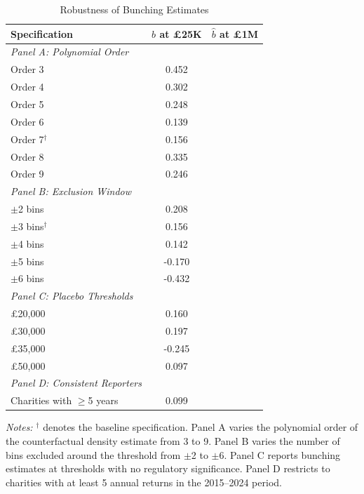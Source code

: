 \begin{table}[htbp]
\centering
\caption{Robustness of Bunching Estimates}
\label{tab:robustness}
\begin{tabular}{lcc}
\hline\hline
Specification & $\hat{b}$ at \pounds25K & $\hat{b}$ at \pounds1M \\
\hline
\addlinespace
\emph{Panel A: Polynomial Order} & & \\
\quad Order 3 & 0.452 & \\
\quad Order 4 & 0.302 & \\
\quad Order 5 & 0.248 & \\
\quad Order 6 & 0.139 & \\
\quad Order 7$^{\dagger}$ & 0.156 & \\
\quad Order 8 & 0.335 & \\
\quad Order 9 & 0.246 & \\
\addlinespace
\emph{Panel B: Exclusion Window} & & \\
\quad $\pm$2 bins & 0.208 & \\
\quad $\pm$3 bins$^{\dagger}$ & 0.156 & \\
\quad $\pm$4 bins & 0.142 & \\
\quad $\pm$5 bins & -0.170 & \\
\quad $\pm$6 bins & -0.432 & \\
\addlinespace
\emph{Panel C: Placebo Thresholds} & & \\
\quad \pounds20,000 & 0.160 & \\
\quad \pounds30,000 & 0.197 & \\
\quad \pounds35,000 & -0.245 & \\
\quad \pounds50,000 & 0.097 & \\
\addlinespace
\emph{Panel D: Consistent Reporters} & & \\
\quad Charities with $\geq$5 years & 0.099 & \\
\hline\hline
\end{tabular}
\begin{tablenotes}[flushleft]
\small
\item \textit{Notes:} $^{\dagger}$ denotes the baseline specification. Panel A varies the polynomial order of the counterfactual density estimate from 3 to 9. Panel B varies the number of bins excluded around the threshold from $\pm$2 to $\pm$6. Panel C reports bunching estimates at thresholds with no regulatory significance. Panel D restricts to charities with at least 5 annual returns in the 2015--2024 period.
\end{tablenotes}
\end{table}
